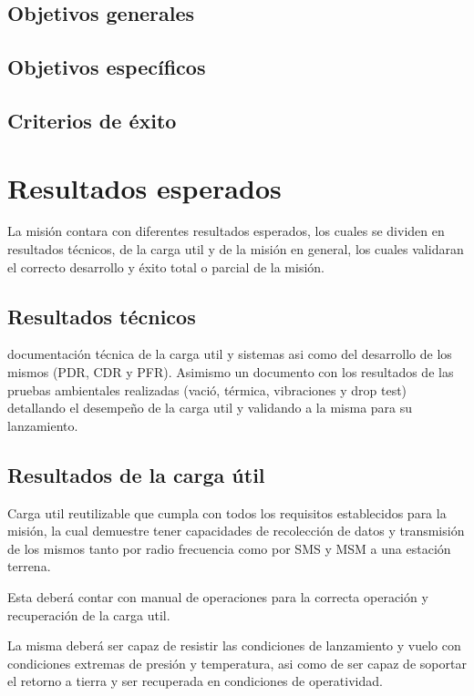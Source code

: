\documentclass[letterpaper,12pt]{article} %
\begin{document}
    \subsection{Objetivos generales}

    \subsection{Objetivos específicos}
    
    \subsection{Criterios de éxito}

    \newpage

\section{Resultados esperados}

    La misión contara con diferentes resultados esperados, los cuales se dividen en resultados técnicos, de la carga util y de la misión en general, 
    los cuales validaran el correcto desarrollo y éxito total o parcial de la misión.

    \subsection{Resultados técnicos}

    documentación técnica de la carga util y sistemas asi como del desarrollo de los mismos
    (PDR, CDR y PFR).
    Asimismo un documento con los resultados de las pruebas ambientales realizadas (vació, térmica, vibraciones y drop test)
    detallando el desempeño de la carga util y validando a la misma para su lanzamiento. 

    \subsection{Resultados de la carga útil}

    Carga util reutilizable que cumpla con todos los requisitos establecidos para la misión, la cual
    demuestre tener capacidades de recolección de datos y transmisión de los mismos tanto por radio
    frecuencia como por SMS y MSM a una estación terrena.
    
    Esta deberá contar con manual de operaciones 
    para la correcta operación y recuperación de la carga util.
    
    La misma deberá ser capaz de resistir las condiciones de lanzamiento y vuelo con condiciones extremas de presión y temperatura,
    asi como de ser capaz de soportar el retorno a tierra y ser recuperada en condiciones de operatividad.
\end{document}
